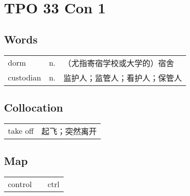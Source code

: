 \section{TPO 33 Con 1}

\subsection{Words}

\begin{tabular}{lll}
    dorm      & n. & （尤指寄宿学校或大学的）宿舍  \\
    custodian & n. & 监护人；监管人；看护人；保管人 \\
\end{tabular}

\subsection{Collocation}

\begin{tabular}{ll}
    take off & 起飞；突然离开 \\
\end{tabular}

\subsection{Map}

\begin{tabular}{rc@{\quad$\to$\quad}l}
    control &  & ctrl \\
\end{tabular}
